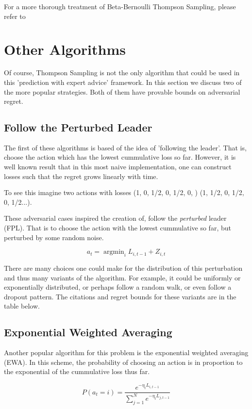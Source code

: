 \documentclass[10pt,a4paper]{article} %
\DeclareMathOperator*{\argmin}{argmin}
\begin{document}
	For a more thorough treatment of Beta-Bernoulli Thompson Sampling, please refer to \cite{agrawal}
	
	\section{Other Algorithms}
	
	Of course, Thompson Sampling is not the only algorithm that could be used in this 'prediction with expert advice' framework.  In this section we discuss two of the more popular strategies.  Both of them have provable bounds on adversarial regret.
	
	\subsection{Follow the Perturbed Leader}
	
	The first of these algorithms is based of the idea of 'following the leader'.  That is, choose the action which has the lowest cummulative loss so far.  However, it is well known result that in this most naive implementation, one can construct losses such that the regret grows linearly with time.
	
	To see this imagine two actions with losses (1, 0, 1/2, 0, 1/2, 0, ) (1, 1/2, 0, 1/2, 0, 1/2...).
	
	These adversarial cases inspired the creation of, follow the \textit{perturbed} leader (FPL).  That is to choose the action with the lowest cummulative so far, but perturbed by some random noise.
	
	$$a_t = \argmin_i L_{i, t-1} + Z_{i, t}$$
	
	There are many choices one could make for the distribution of this perturbation and thus many variants of the algorithm.  For example, it could be uniformly or exponentially distributed, or perhaps follow a random walk, or even follow a dropout pattern.  The citations and regret bounds for these variants are in the table below.
	
	\subsection{Exponential Weighted Averaging}
	
	Another popular algorithm for this problem is the exponential weighted averaging (EWA).  In this scheme, the probability of choosing an action is in proportion to the exponential of the cummulative loss thus far. 
	
	$$P(a_t = i) = \frac{e^{-\eta_t L_{i, t - 1}}}{\sum_{j = 1}^N  e^{-\eta_t L_{j, t - 1}}}$$
	
\end{document}
